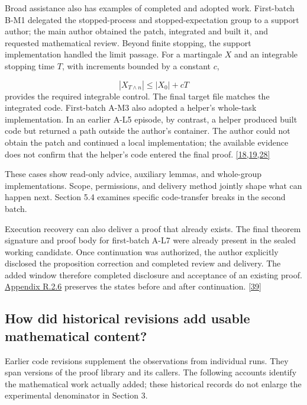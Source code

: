 Broad assistance also has examples of completed and adopted work. First-batch B-M1 delegated the stopped-process and stopped-expectation group to a support author; the main author obtained the patch, integrated and built it, and requested mathematical review. Beyond finite stopping, the support implementation handled the limit passage. For a martingale $X$ and an integrable stopping time $T$, with increments bounded by a constant $c$,

\[
|X_{T\wedge n}|\leq |X_0|+cT
\]
provides the required integrable control. The final target file matches the integrated code. First-batch A-M3 also adopted a helper's whole-task implementation. In an earlier A-L5 episode, by contrast, a helper produced built code but returned a path outside the author's container. The author could not obtain the patch and continued a local implementation; the available evidence does not confirm that the helper's code entered the final proof. \hyperlink{ref-18}{\mbox{[18,19,28]}}

These cases show read-only advice, auxiliary lemmas, and whole-group implementations. Scope, permissions, and delivery method jointly shape what can happen next. Section 5.4 examines specific code-transfer breaks in the second batch.

Execution recovery can also deliver a proof that already exists. The final theorem signature and proof body for first-batch A-L7 were already present in the sealed working candidate. Once continuation was authorized, the author explicitly disclosed the proposition correction and completed review and delivery. The added window therefore completed disclosure and acceptance of an existing proof. \href{en-appendix.pdf\#r2-6}{Appendix R.2.6} preserves the states before and after continuation. \hyperlink{ref-39}{\mbox{[39]}}

\subsection[How did historical revisions add usable mathematical content?]{\texorpdfstring{\protect\hypertarget{section-4-4}{}How did historical revisions add usable mathematical content?}{How did historical revisions add usable mathematical content?}}
Earlier code revisions supplement the observations from individual runs. They span versions of the proof library and its callers. The following accounts identify the mathematical work actually added; these historical records do not enlarge the experimental denominator in Section 3.

